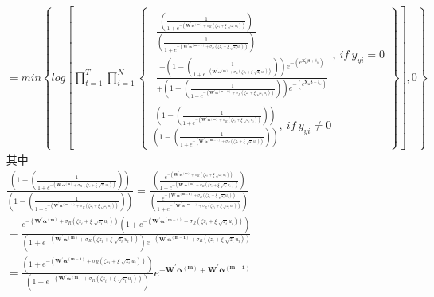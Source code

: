 \documentclass[12pt,a4paper]{article}
\begin{document}
\begin{CJK}{UTF8}{bkai}
\begin{align*}
 & =
 min\left\{log\left[\prod_{t=1}^T\prod_{i=1}^N
 \begin{Bmatrix}
 \begin{matrix}
 \frac{\left( \frac{1}{1+e^{-(\bm{W^\prime}\bm{\alpha^{(m)}}+\sigma_R(\zeta z_i+\xi \sqrt[]{z_i} u_i))}} \right)}{\left( \frac{1}{1+e^{-(\bm{W^\prime}\bm{\alpha^{(m-1)}}+\sigma_R(\zeta z_i+\xi \sqrt[]{z_i} u_i))}} \right)} \\[3mm]
 \frac{+\left(1-\left( \frac{1}{1+e^{-(\bm{W^\prime}\bm{\alpha^{(m)}}+\sigma_R(\zeta z_i+\xi \sqrt[]{z_i} u_i))}} \right)\right)e^{-\left(e^{\bm{X_{ti}^\prime\bm{\beta}}+\delta_{ti}}\right)}}{+\left(1-\left( \frac{1}{1+e^{-(\bm{W^\prime}\bm{\alpha^{(m-1)}}+\sigma_R(\zeta z_i+\xi \sqrt[]{z_i} u_i))}} \right)\right)e^{-\left(e^{\bm{X_{ti}^\prime\bm{\beta}}+\delta_{ti}}\right)}}
 \end{matrix}, \ if \ y_{yi} = 0 \\[3mm]
 \frac{\left(1-\left( \frac{1}{1+e^{-(\bm{W^\prime}\bm{\alpha^{(m)}}+\sigma_R(\zeta z_i+\xi \sqrt[]{z_i} u_i))}} \right)\right)}{\left(1-\left( \frac{1}{1+e^{-(\bm{W^\prime}\bm{\alpha^{(m-1)}}+\sigma_R(\zeta z_i+\xi \sqrt[]{z_i} u_i))}} \right)\right)} , \ if \ y_{yi} \ne 0
 \end{Bmatrix}
\right],0\right\} \\[3mm]
&\mbox{其中}\\[3mm]
 & \frac{\left(1-\left( \frac{1}{1+e^{-(\bm{W^\prime}\bm{\alpha^{(m)}}+\sigma_R(\zeta z_i+\xi \sqrt[]{z_i} u_i))}} \right)\right)}{\left(1-\left( \frac{1}{1+e^{-(\bm{W^\prime}\bm{\alpha^{(m-1)}}+\sigma_R(\zeta z_i+\xi \sqrt[]{z_i} u_i))}} \right)\right)} = \frac{\left(\frac{e^{-(\bm{W^\prime}\bm{\alpha^{(m)}}+\sigma_R(\zeta z_i+\xi \sqrt[]{z_i} u_i))}}{1+e^{-(\bm{W^\prime}\bm{\alpha^{(m)}}+\sigma_R(\zeta z_i+\xi \sqrt[]{z_i} u_i))}}\right)}{\left(\frac{e^{-(\bm{W^\prime}\bm{\alpha^{(m-1)}}+\sigma_R(\zeta z_i+\xi \sqrt[]{z_i} u_i))}}{1+e^{-(\bm{W^\prime}\bm{\alpha^{(m-1)}}+\sigma_R(\zeta z_i+\xi \sqrt[]{z_i} u_i))}}\right)} \\[3mm]
 & =
\frac{e^{-(\bm{W^\prime}\bm{\alpha^{(m)}}+\sigma_R(\zeta z_i+\xi \sqrt[]{z_i} u_i))}\left(1+e^{-(\bm{W^\prime}\bm{\alpha^{(m-1)}}+\sigma_R(\zeta z_i+\xi \sqrt[]{z_i} u_i))}\right)}{\left(1+e^{-(\bm{W^\prime}\bm{\alpha^{(m)}}+\sigma_R(\zeta z_i+\xi \sqrt[]{z_i} u_i))}\right)e^{-(\bm{W^\prime}\bm{\alpha^{(m-1)}}+\sigma_R(\zeta z_i+\xi \sqrt[]{z_i} u_i))}} \\[3mm]
 & =
\frac{\left(1+e^{-(\bm{W^\prime}\bm{\alpha^{(m-1)}}+\sigma_R(\zeta z_i+\xi \sqrt[]{z_i} u_i))}\right)}{\left(1+e^{-(\bm{W^\prime}\bm{\alpha^{(m)}}+\sigma_R(\zeta z_i+\xi \sqrt[]{z_i} u_i))}\right)}e^{-\bm{W^\prime}\bm{\alpha^{(m)}}+\bm{W^\prime}\bm{\alpha^{(m-1)}}}

\end{align*}
\end{CJK}
\end{document}
